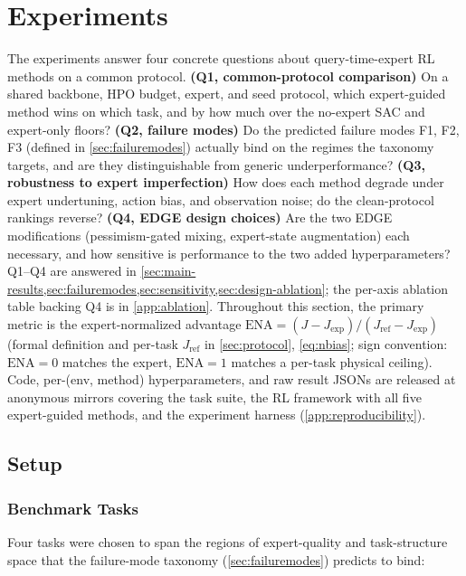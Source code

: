 \documentclass{article}
\begin{document}
\section{Experiments}
\label{sec:experiments}

The experiments answer four concrete questions about query-time-expert
RL methods on a common protocol.
\textbf{(Q1, common-protocol comparison)} On a shared backbone, HPO
budget, expert, and seed protocol, which expert-guided method wins on
which task, and by how much over the no-expert SAC and expert-only
floors? \textbf{(Q2, failure modes)} Do the predicted failure modes
F1, F2, F3 (defined in \cref{sec:failuremodes}) actually bind on the
regimes the taxonomy targets, and are they distinguishable from
generic underperformance? \textbf{(Q3,
robustness to expert imperfection)} How does each method degrade
under expert undertuning, action bias, and observation noise; do the
clean-protocol rankings reverse? \textbf{(Q4, EDGE design choices)}
Are the two EDGE modifications (pessimism-gated mixing, expert-state
augmentation) each necessary, and how sensitive is performance to the
two added hyperparameters? Q1--Q4 are answered in
\cref{sec:main-results,sec:failuremodes,sec:sensitivity,sec:design-ablation};
the per-axis ablation table backing Q4 is in \cref{app:ablation}.
Throughout this section, the primary metric is the expert-normalized
advantage $\mathrm{ENA} = (J - J_{\mathrm{exp}})/(J_{\mathrm{ref}} -
J_{\mathrm{exp}})$ (formal definition and per-task $J_{\mathrm{ref}}$
in \cref{sec:protocol}, \cref{eq:nbias}; sign convention:
$\mathrm{ENA}\!=\!0$ matches the expert, $\mathrm{ENA}\!=\!1$ matches
a per-task physical ceiling). Code, per-(env, method) hyperparameters, and raw
result JSONs are released at anonymous mirrors covering the task
suite, the RL framework with all five expert-guided methods, and the
experiment harness (\cref{app:reproducibility}).

\subsection{Setup}

\subsubsection{Benchmark Tasks}

Four tasks were chosen to span the regions of expert-quality and
task-structure space that the failure-mode taxonomy
(\cref{sec:failuremodes}) predicts to bind:
\end{document}
